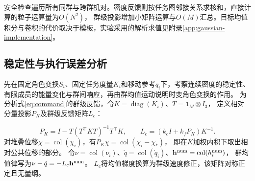 \documentclass[UTF8,a4paper,11pt,fontset=none]{ctexart}
\newcommand{\diag}{\operatorname{diag}}\newcommand{\col}{\operatorname{col}}
\begin{document}
\begin{center}\end{center}
安全检查遍历所有同群与跨群机对。密度反馈则按任务图邻接关系求核和，直接计算的粒子运算量为$O(N^2)$，
群级投影增加小矩阵运算与$O(M)$汇总。目标均值积分与卷积的代价取决于模板，实验采用的解析求值见附录\ref{app:gaussian-implementation}。

\subsection{稳定性与执行误差分析}\label{sec:nominal-properties}\label{sec:execution-errors}\label{sec:formation-response}
先在固定角色变换$S_i$、固定任务度量$K_i$和移动参考$q_i$下，考察连续密度的稳定性、有限成员的能量变化与群间响应，再由群均值运动说明时变角色变换的作用。
为分析式\eqref{eq:command}的群级反馈，令$K=\diag(K_i)$、$T=\mathbf1_M\otimes I_3$，
定义相对分量投影$P_K$及群级反馈矩阵$L_c$：

\begin{equation}
P_K=I-T(T^\top KT)^{-1}T^\top K,\qquad
L_c=(k_cI+k_fP_K)K^{-1}.
\label{eq:mobility}
\end{equation}
对堆叠位移$\chi=\col(\chi_i)$，有$P_K\chi=\col(\chi_i-\chi_*)$，
即在$K$加权内积下取出相对公共位移的部分。
令$\nu=\col(\nu_i)$、$\dot q=\col(\dot q_i)$、$\mathbf h^{\rm num}=\col(h_i^{\rm num})$，
群均值律写为$\nu-\dot q=-L_c\mathbf h^{\rm num}$。
$L_c$将均值梯度换算为群级速度修正，该矩阵对称正定且无量纲。
\end{document}
